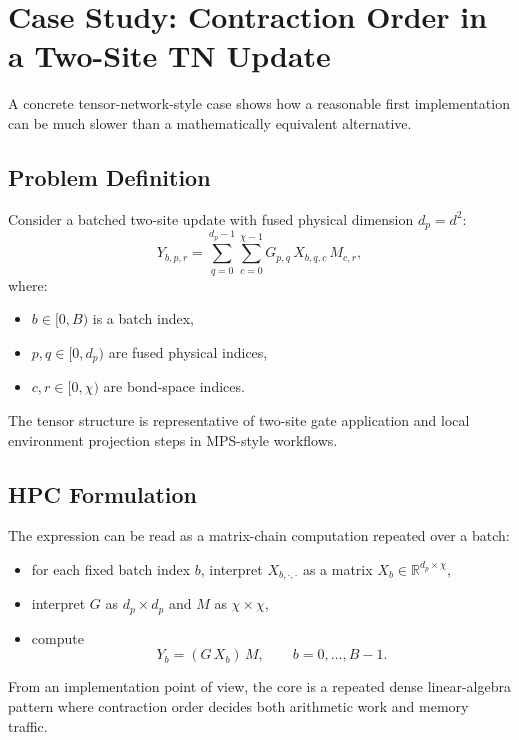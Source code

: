 \section{Case Study: Contraction Order in a Two-Site TN Update}
\label{sec:tn-contraction-order-case}

A concrete tensor-network-style case shows how a reasonable first
implementation can be much slower than a mathematically equivalent
alternative.

\subsection{Problem Definition}

Consider a batched two-site update with fused physical dimension $d_p=d^2$:
\[
  Y_{b,p,r}
  =
  \sum_{q=0}^{d_p-1}\sum_{c=0}^{\chi-1}
  G_{p,q}\,X_{b,q,c}\,M_{c,r},
\]
where:
\begin{itemize}
  \item $b\in[0,B)$ is a batch index,
  \item $p,q\in[0,d_p)$ are fused physical indices,
  \item $c,r\in[0,\chi)$ are bond-space indices.
\end{itemize}

The tensor structure is representative of two-site gate application and local
environment projection steps in MPS-style workflows.

\subsection{HPC Formulation}

The expression can be read as a matrix-chain computation repeated over a batch:
\begin{itemize}
  \item for each fixed batch index $b$, interpret $X_{b,\cdot,\cdot}$ as a
  matrix $X_b\in\mathbb{R}^{d_p\times \chi}$,
  \item interpret $G$ as $d_p\times d_p$ and $M$ as $\chi\times\chi$,
  \item compute
  \[
    Y_b = (G\,X_b)\,M,\qquad b=0,\dots,B-1.
  \]
\end{itemize}

From an implementation point of view, the core is a repeated dense
linear-algebra pattern where contraction order decides both arithmetic work and
memory traffic.

